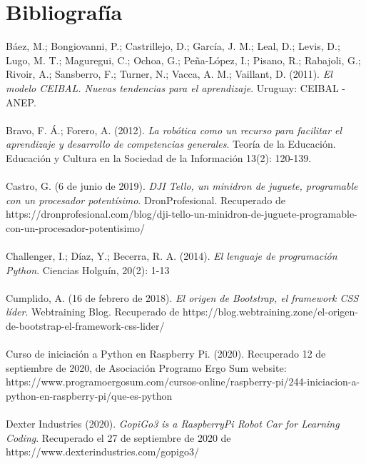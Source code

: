 \documentclass{report}
\begin{document}

\chapter{Bibliografía}

Báez, M.; Bongiovanni, P.; Castrillejo, D.; García, J. M.; Leal, D.; Levis, D.; Lugo, M. T.; Maguregui, C.; Ochoa, G.;  Peña-López, I.; Pisano, R.; Rabajoli, G.; Rivoir, A.; Sansberro, F.; Turner, N.; Vacca, A. M.; Vaillant, D. (2011).  \textit{El modelo CEIBAL. Nuevas tendencias para el aprendizaje}. Uruguay: CEIBAL - ANEP.
\\
\\
Bravo, F. Á.; Forero, A. (2012). \textit{La robótica como un recurso para facilitar el aprendizaje y desarrollo de competencias generales}. Teoría de la Educación. Educación y Cultura en la Sociedad de la Información 13(2): 120-139.
\\
\\
Castro, G. (6 de junio de 2019).  \textit{DJI Tello, un minidron de juguete, programable con un procesador potentísimo}. DronProfesional. Recuperado de https://dronprofesional.com/blog/dji-tello-un-minidron-de-juguete-programable-con-un-procesador-potentisimo/
\\
\\
Challenger, I.; Díaz, Y.; Becerra, R. A. (2014). \textit{El lenguaje de programación Python}. Ciencias Holguín, 20(2): 1-13
\\
\\
Cumplido, A. (16 de febrero de 2018).  \textit{El origen de Bootstrap, el framework CSS líder}. Webtraining Blog. Recuperado de https://blog.webtraining.zone/el-origen-de-bootstrap-el-framework-css-lider/
\\
\\
Curso de iniciación a Python en Raspberry Pi. (2020). Recuperado 12 de septiembre de 2020, de Asociación Programo Ergo Sum website: https://www.programoergosum.com/cursos-online/raspberry-pi/244-iniciacion-a-python-en-raspberry-pi/que-es-python
\\
\\
Dexter Industries (2020). \textit{GopiGo3 is a RaspberryPi Robot Car for Learning Coding}. Recuperado el 27 de septiembre de 2020 de https://www.dexterindustries.com/gopigo3/
\\
\end{document}

